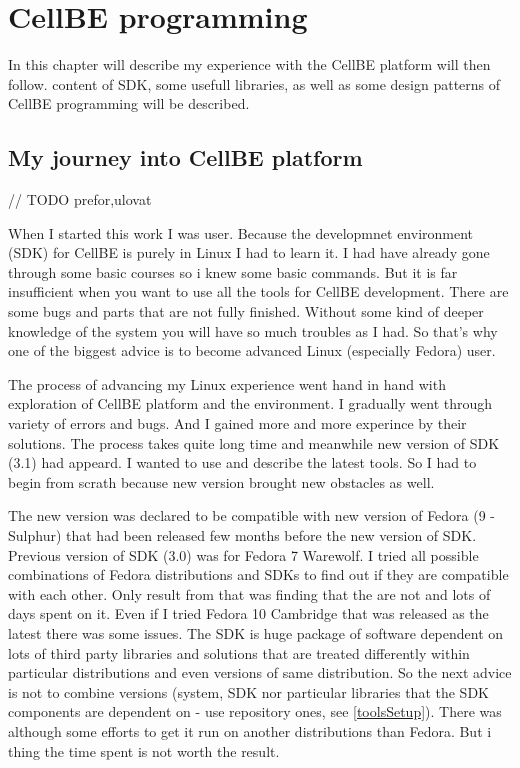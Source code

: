 \chapter {CellBE programming} 
\par
In this chapter will describe my experience with the CellBE platform will then follow. content of SDK, some usefull libraries, as well as some design patterns of CellBE programming will be described.

\section{My journey into CellBE platform}	// TODO prefor,ulovat
\par
When I started this work I was  user. Because the developmnet environment (SDK) for CellBE is purely in Linux I had to learn it. I had have already gone through some basic courses so i knew some basic commands. But it is far insufficient when you want to use all the tools for CellBE development. There are some bugs and parts that are not fully finished. Without some kind of deeper knowledge of the system you will have so much troubles as I had. So that's why one of the biggest advice is to become advanced Linux (especially Fedora) user.

\par
The process of advancing my Linux experience went hand in hand with exploration of CellBE platform and the environment. I gradually went through variety of errors and bugs. And I gained more and more experince by their solutions. The process takes quite long time and meanwhile new version of SDK (3.1) had appeard. I wanted to use and describe the latest tools. So I had to begin from scrath because new version brought new obstacles as well.

\par
The new version was declared to be compatible with new version of Fedora (9 -
Sulphur) that had been released few months before the new version of SDK.
Previous version of SDK (3.0) was for Fedora 7 Warewolf. I tried all possible
combinations of Fedora distributions and SDKs to find out if they are compatible
with each other. Only result from that was finding that the are not and lots of
days spent on it. Even if I tried Fedora 10 Cambridge that was released as the
latest there was some issues. The SDK is huge package of software dependent on
lots of third party libraries and solutions that are treated differently within
particular distributions and even versions of same distribution. So the next
advice is not to combine versions (system, SDK nor particular libraries that the
SDK components are dependent on - use repository ones, see \ref{toolsSetup}).
There was although some efforts to get it run on another distributions than
Fedora. But i thing the time spent is not worth the result.

